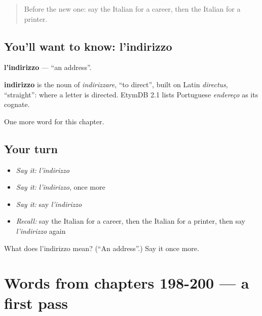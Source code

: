 \label{lesson:IT-C203-indirizzo}



\begin{quote}
Before the new one: say the Italian for a career, then the Italian for a printer.
\end{quote}

\subsection*{You'll want to know: l'indirizzo}
\textbf{l'indirizzo} — \textquotedblleft{}an address\textquotedblright{}.

\begin{cousinweb}
\textbf{indirizzo} is the noun of \emph{indirizzare}, \textquotedblleft{}to direct\textquotedblright{}, built on Latin \emph{directus}, \textquotedblleft{}straight\textquotedblright{}: where a letter is directed. EtymDB 2.1 lists Portuguese \emph{endereço} as its cognate.
\end{cousinweb}

\begin{grammarlens}[title={What you've built}]
One more word for this chapter.
\end{grammarlens}

\subsection*{Your turn}
\begin{itemize}
\raggedright
  \item \emph{Say it:} \emph{l'indirizzo}
  \item \emph{Say it:} \emph{l'indirizzo}, once more
  \item \emph{Say it:} say \emph{l'indirizzo}
  \item \emph{Recall:} say the Italian for a career, then the Italian for a printer, then say \emph{l'indirizzo} again
\end{itemize}

\begin{tcolorbox}[breakable,colback=teal!4,colframe=teal!35!black,title={Before you move on}]
What does l'indirizzo mean? (\textquotedblleft{}An address\textquotedblright{}.) Say it once more.
\end{tcolorbox}
\section[(dialogue)]{Words from chapters 198-200 — a first pass}

